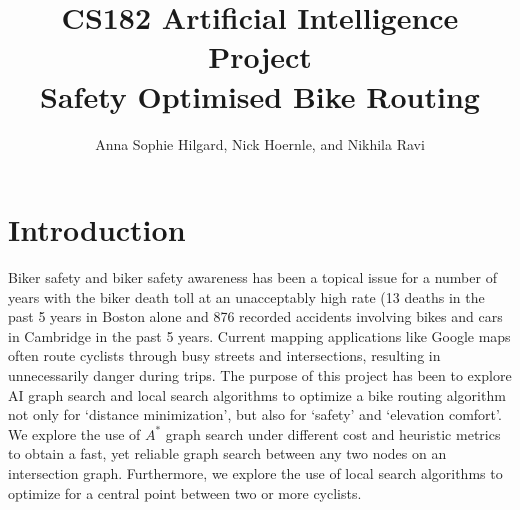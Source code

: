 \documentclass[11pt]{article}
\title{CS182 Artificial Intelligence Project \\ \Large{Safety Optimised Bike Routing}}
\author{Anna Sophie Hilgard, Nick Hoernle, and Nikhila Ravi}
\begin{document}
\maketitle{}



\setlength{\parindent}{2em}
\setlength{\parskip}{1em}
\renewcommand{\baselinestretch}{1.3}

\section{Introduction}

Biker safety and biker safety awareness has been a topical issue for a number of years with the biker death toll at an unacceptably high rate (13 deaths in the past 5 years in Boston alone and 876 recorded accidents involving bikes and cars in Cambridge in the past 5 years. Current mapping applications like Google maps often route cyclists through busy streets and intersections, resulting in unnecessarily danger during trips. The purpose of this project has been to explore AI graph search and local search algorithms to optimize a bike routing algorithm not only for `distance minimization', but also for `safety' and `elevation comfort'. We explore the use of $A^{*}$ graph search under different cost and heuristic metrics to obtain a fast, yet reliable graph search between any two nodes on an intersection graph. Furthermore, we explore the use of local search algorithms to optimize for a central point between two or more cyclists.


\end{document}
